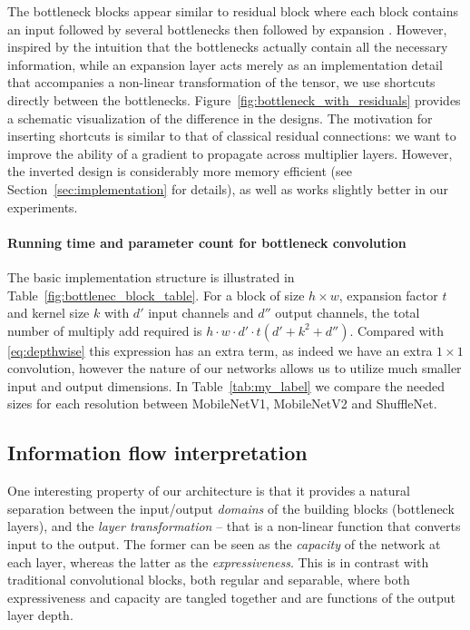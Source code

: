 \documentclass[10pt,twocolumn,letterpaper]{article}
\begin{document}
The bottleneck blocks appear similar to residual block where each block contains an input followed by several bottlenecks then followed by expansion \cite{ResNet}.
However, inspired by the intuition that the bottlenecks actually contain all the necessary information, while an expansion layer acts merely as an implementation detail that accompanies a non-linear transformation of the tensor, we use shortcuts directly between the bottlenecks.
Figure~\ref{fig:bottleneck_with_residuals} provides a schematic visualization of the difference in the designs.
The motivation for inserting shortcuts is similar to that of classical residual connections: we want to improve the ability of a gradient to propagate across  multiplier layers.
However, the inverted design is considerably more memory efficient (see Section~\ref{sec:implementation} for details), as well as works slightly better in our experiments. 
%
%
%
%
%

\paragraph{Running time and parameter count for bottleneck convolution}
The basic implementation structure is illustrated in Table~\ref{fig:bottlenec_block_table}.
For a block of size $h\times w$, expansion factor $t$ and kernel size $k$ with $d'$ input channels and $d''$ output channels, the total number of multiply add required is 
$h \cdot w \cdot d' \cdot t(d' + k^2 + d'')$.
Compared with \eqref{eq:depthwise} this expression has an extra term, as indeed we have an extra $1\times 1$ convolution, however the nature of our networks allows us to utilize much smaller input and output dimensions.
In Table~\ref{tab:my_label} we compare the needed sizes for each resolution between \mbox{MobileNetV1}, \mbox{MobileNetV2} and \mbox{ShuffleNet}.


\subsection{Information flow interpretation}
\label{sec:information-flow}
One interesting property of our architecture is that it provides a natural separation between the input/output {\em domains} of the building blocks (bottleneck layers), and the {\em layer transformation} -- that is a non-linear function that converts input to the output.
The former can be seen as the {\em capacity} of the network at each layer, whereas the latter as the {\em expressiveness}.
This is in contrast with traditional convolutional blocks, both regular and separable, where both expressiveness and capacity are tangled together and are functions of the output layer depth.
\end{document}
